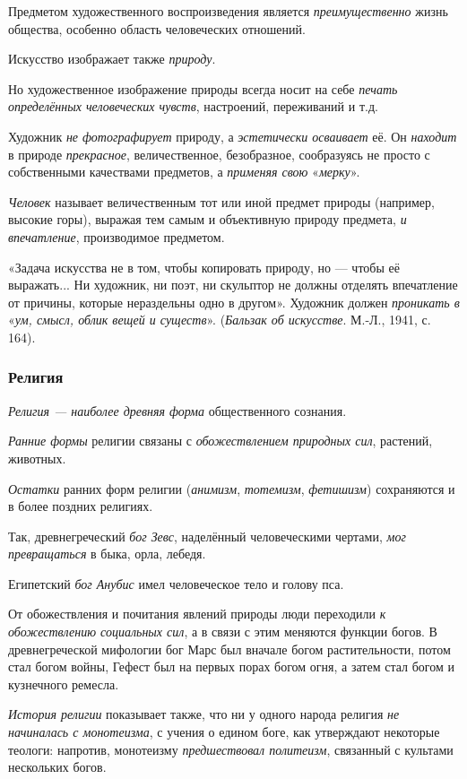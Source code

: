 \documentclass[a4paper,14pt,russian]{extreport}
\begin{document}
Предметом художественного воспроизведения является \emph{преимущественно} жизнь общества, особенно область человеческих отношений.

Искусство изображает также \emph{природу}.

Но художественное изображение природы всегда носит на себе \emph{печать определённых человеческих чувств}, настроений, переживаний и т.д.

Художник \emph{не фотографирует} природу, а \emph{эстетически осваивает} её. Он \emph{находит} в природе \emph{прекрасное}, величественное, безобразное, сообразуясь не просто с собственными качествами предметов, а \emph{применяя свою} «\emph{мерку}».

\emph{Человек} называет величественным тот или иной предмет природы (например, высокие горы), выражая тем самым и объективную природу предмета, \emph{и впечатление}, производимое предметом.

«Задача искусства не в том, чтобы копировать природу, но --- чтобы её выражать... Ни художник, ни поэт, ни скульптор не должны отделять впечатление от причины, которые нераздельны одно в другом». Художник должен \emph{проникать в} «\emph{ум, смысл, облик вещей и существ}». (\emph{Бальзак об искусстве}. М.-Л., 1941, с. 164).

\subsubsection{Религия}

\emph{Религия --- наиболее древняя форма} общественного сознания.

\emph{Ранние формы} религии связаны с \emph{обожествлением природных сил}, растений, животных.

\emph{Остатки} ранних форм религии (\emph{анимизм}, \emph{тотемизм}, \emph{фетишизм}) сохраняются и в более поздних религиях.

Так, древнегреческий \emph{бог Зевс}, наделённый человеческими чертами, \emph{мог превращаться} в быка, орла, лебедя.

Египетский \emph{бог Анубис} имел человеческое тело и голову пса.

От обожествления и почитания явлений природы люди переходили \emph{к обожествлению социальных сил}, а в связи с этим меняются функции богов. В древнегреческой мифологии бог Марс был вначале богом растительности, потом стал богом войны, Гефест был на первых порах богом огня, а затем стал богом и кузнечного ремесла.

\emph{История религии} показывает также, что ни у одного народа религия \emph{не начиналась с монотеизма}, с учения о едином боге, как утверждают некоторые теологи: напротив, монотеизму \emph{предшествовал политеизм}, связанный с культами нескольких богов.
\end{document}
